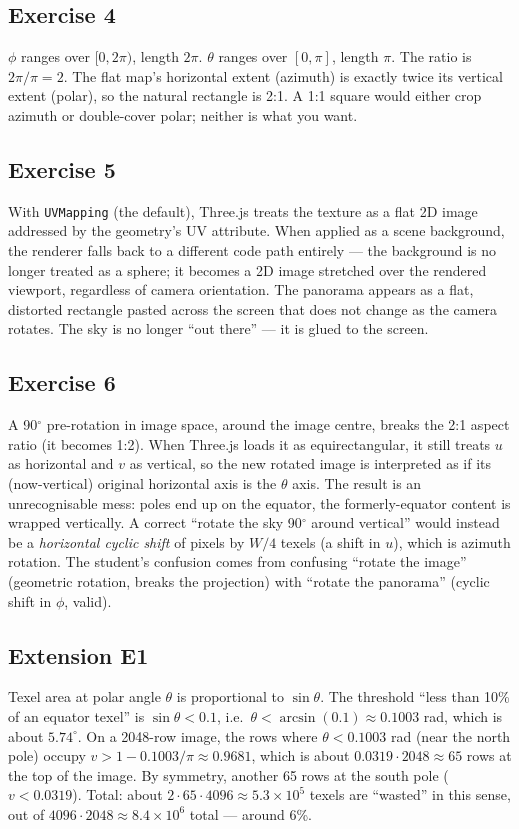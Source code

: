 \documentclass{article}
\begin{document}
\subsection*{Exercise 4}
$\phi$ ranges over $[0, 2\pi)$, length $2\pi$. $\theta$ ranges over
$[0, \pi]$, length $\pi$. The ratio is $2\pi / \pi = 2$. The flat map's
horizontal extent (azimuth) is exactly twice its vertical extent (polar),
so the natural rectangle is 2:1. A 1:1 square would either crop azimuth or
double-cover polar; neither is what you want.

\subsection*{Exercise 5}
With \texttt{UVMapping} (the default), Three.js treats the texture as a
flat 2D image addressed by the geometry's UV attribute. When applied as a
scene background, the renderer falls back to a different code path entirely
--- the background is no longer treated as a sphere; it becomes a 2D image
stretched over the rendered viewport, regardless of camera orientation. The
panorama appears as a flat, distorted rectangle pasted across the screen
that does not change as the camera rotates. The sky is no longer ``out
there'' --- it is glued to the screen.

\subsection*{Exercise 6}
A 90$^\circ$ pre-rotation in image space, around the image centre, breaks
the 2:1 aspect ratio (it becomes 1:2). When Three.js loads it as
equirectangular, it still treats $u$ as horizontal and $v$ as vertical, so
the new rotated image is interpreted as if its (now-vertical) original
horizontal axis is the $\theta$ axis. The result is an unrecognisable mess:
poles end up on the equator, the formerly-equator content is wrapped vertically.
A correct ``rotate the sky 90$^\circ$ around vertical'' would instead be a
\emph{horizontal cyclic shift} of pixels by $W/4$ texels (a shift in $u$),
which is azimuth rotation. The student's confusion comes from confusing
``rotate the image'' (geometric rotation, breaks the projection) with
``rotate the panorama'' (cyclic shift in $\phi$, valid).

\subsection*{Extension E1}
Texel area at polar angle $\theta$ is proportional to $\sin\theta$. The
threshold ``less than 10\% of an equator texel'' is $\sin\theta < 0.1$,
i.e.\ $\theta < \arcsin(0.1) \approx 0.1003$ rad, which is about $5.74^\circ$.
On a 2048-row image, the rows where $\theta < 0.1003$ rad (near the north
pole) occupy $v > 1 - 0.1003/\pi \approx 0.9681$, which is about
$0.0319 \cdot 2048 \approx 65$ rows at the top of the image. By symmetry,
another 65 rows at the south pole ($v < 0.0319$). Total: about
$2 \cdot 65 \cdot 4096 \approx 5.3 \times 10^5$ texels are ``wasted'' in
this sense, out of $4096 \cdot 2048 \approx 8.4 \times 10^6$ total ---
around 6\%.
\end{document}
